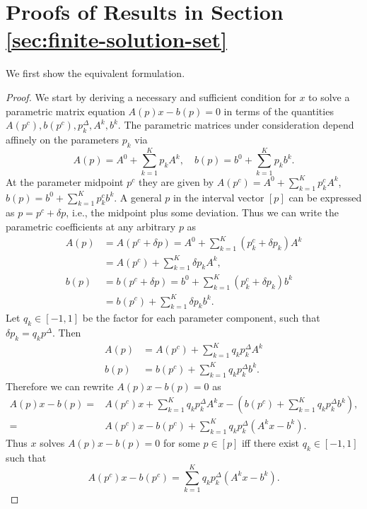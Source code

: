 \documentclass{article}
\theoremstyle{definition}
\theoremstyle{remark}
\begin{document}
\newpage 
\section{Proofs of Results in Section \ref{sec:finite-solution-set}}
\label{subsec:proofs_4}

We first show the equivalent formulation. 

\colzonotope* 

\begin{proof}
\label{proof:zonotope-parametric}
    We start by deriving a necessary and sufficient condition for $x$ to solve a parametric matrix equation $A(p)x - b(p) = 0$ in terms of the quantities $A(p^c), b(p^c), p_k^\Delta, A^k, b^k$. The parametric matrices under consideration depend affinely on the parameters $p_k$ via 
    $$
    A(p) = A^0 + \sum_{k=1}^K p_kA^k, \quad 
    b(p) = b^0 + \sum_{k=1}^K p_kb^k.
    $$
%
    At the parameter midpoint $p^c$ they are given by $A(p^c) = A^0 + \sum_{k=1}^K p^c_kA^k$, $b(p) = b^0 + \sum_{k=1}^K p^c_kb^k$. 
    A general $p$ in the interval vector $[p]$ can be expressed as $p = p^c + \delta p$, i.e., the midpoint plus some deviation. 
    Thus we can write the parametric coefficients at any arbitrary $p$ as 
    \begin{align*}
    A(p) &= A(p^c + \delta p) = A^0 + \sum_{k=1}^K (p^c_k + \delta p_k)A^k\\ &= A(p^c) + \sum_{k=1}^K \delta p_k A^k,\\
    b(p) &= b(p^c + \delta p)= b^0 + \sum_{k=1}^K (p^c_k + \delta p_k) b^k \\
    &= b(p^c) + \sum_{k=1}^K \delta p_k b^k.
    \end{align*}
%
    Let $q_k \in [-1,1]$ be the factor for each parameter component, such that $\delta p_k = q_kp^\Delta$. 
    Then  
    \begin{align*}
        A(p) &= A(p^c) + \sum_{k=1}^K q_k p_k^\Delta A^k \\
        b(p) &= b(p^c) + \sum_{k=1}^K q_k p_k^\Delta b^k. 
    \end{align*}
%
   Therefore we can rewrite $A(p)x-b(p) = 0$ as 
    \begin{align*}
        A(p)x - b(p) =& 
        A(p^c)x + \sum_{k=1}^K q_k p_k^\Delta A^kx  - ( b(p^c) + \sum_{k=1}^K q_k p_k^\Delta b^k ), \\
       =& A(p^c)x-b(p^c) + \sum_{k=1}^K q_k p_k^\Delta (A^kx-b^k).
    \end{align*}
%
    Thus $x$ solves $A(p)x-b(p) = 0$ for some $p\in[p]$ 
    iff there exist $q_k \in [-1,1]$ such that
    \begin{equation*}
        A(p^c)x-b(p^c) = \sum_{k=1}^K q_k p_k^\Delta (A^kx-b^k).
    \label{eq:iff-proof}    
    \end{equation*}    
\end{proof}
\end{document}
